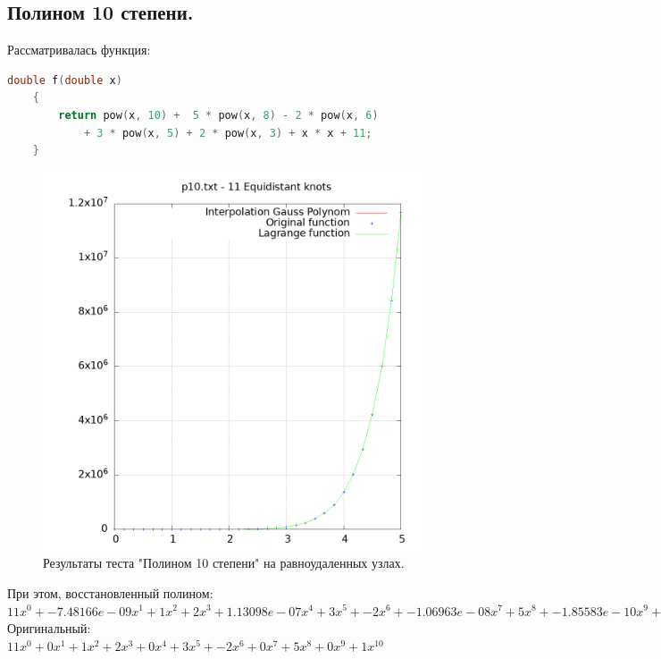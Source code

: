 \documentclass[14pt,a4paper]{extarticle}
\newcommand{\1}{\mathbbm{1}}
\begin{document}
\subsection{Полином 10 степени.}
Рассматривалась функция:
\begin{lstlisting}[language=c++]
    double f(double x)
    {
        return pow(x, 10) +  5 * pow(x, 8) - 2 * pow(x, 6) 
            + 3 * pow(x, 5) + 2 * pow(x, 3) + x * x + 11;
    }
    \end{lstlisting}
    \begin{figure}
        \centering
        \includegraphics[scale=0.5]{Images/p10.txt.png}
        \caption{Результаты теста "Полином 10 степени" на равноудаленных узлах.}
    \end{figure}
    При этом, восстановленный полином: \\
    $11x^0 + -7.48166e-09x^1 + 1x^2 + 2x^3 + 1.13098e-07x^4 + 3x^5 + -2x^6 + -1.06963e-08x^7 + 5x^8 + -1.85583e-10x^9 + 1x^10$ \\
    Оригинальный: \\
    $11x^0 + 0x^1 + 1x^2 + 2x^3 + 0x^4 + 3x^5 + -2x^6 + 0x^7 + 5x^8 + 0x^9 + 1x^10$
\end{document}
